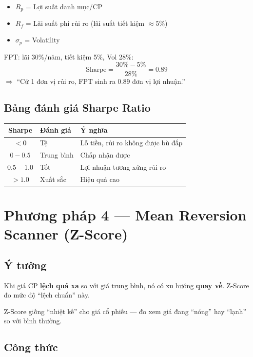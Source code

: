 \documentclass[12pt,a4paper]{article}
\begin{document}
\begin{itemize}[nosep]
  \item $R_p$ = Lợi suất danh mục/CP
  \item $R_f$ = Lãi suất phi rủi ro (lãi suất tiết kiệm $\approx 5\%$)
  \item $\sigma_p$ = Volatility
\end{itemize}

\begin{examplebox}[Ví dụ]
FPT: lãi 30\%/năm, tiết kiệm 5\%, Vol 28\%:
$$\text{Sharpe} = \frac{30\% - 5\%}{28\%} = 0.89$$
$\Rightarrow$ ``Cứ 1 đơn vị rủi ro, FPT sinh ra 0.89 đơn vị lợi nhuận.''
\end{examplebox}

\subsection{Bảng đánh giá Sharpe Ratio}

\begin{tabularx}{\textwidth}{c l l}
\toprule
\textbf{Sharpe} & \textbf{Đánh giá} & \textbf{Ý nghĩa} \\
\midrule
$< 0$ & Tệ & Lỗ tiền, rủi ro không được bù đắp \\
$0 - 0.5$ & Trung bình & Chấp nhận được \\
$0.5 - 1.0$ & Tốt & Lợi nhuận tương xứng rủi ro \\
$> 1.0$ & Xuất sắc & Hiệu quả cao \\
\bottomrule
\end{tabularx}

\newpage
\section{Phương pháp 4 — Mean Reversion Scanner (Z-Score)}

\subsection{Ý tưởng}
Khi giá CP \textbf{lệch quá xa} so với giá trung bình, nó có xu hướng \textbf{quay về}. Z-Score đo mức độ ``lệch chuẩn'' này.

\begin{infobox}[Ví von]
Z-Score giống ``nhiệt kế'' cho giá cổ phiếu — đo xem giá đang ``nóng'' hay ``lạnh'' so với bình thường.
\end{infobox}

\subsection{Công thức}
\end{document}
